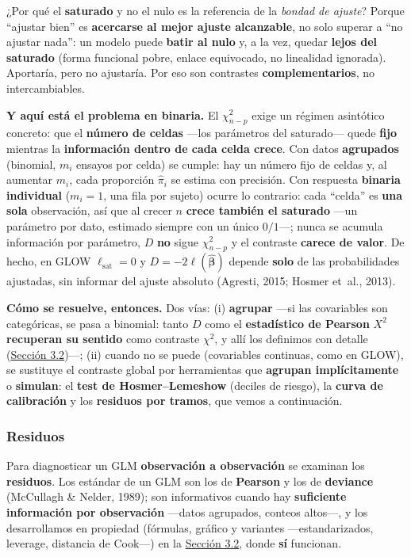 \documentclass[
  letterpaper,
  DIV=11,
  numbers=noendperiod]{scrartcl}
\begin{document}
¿Por qué el \textbf{saturado} y no el nulo es la referencia de la
\emph{bondad de ajuste}? Porque ``ajustar bien'' es \textbf{acercarse al
mejor ajuste alcanzable}, no solo superar a ``no ajustar nada'': un
modelo puede \textbf{batir al nulo} y, a la vez, quedar \textbf{lejos
del saturado} (forma funcional pobre, enlace equivocado, no linealidad
ignorada). Aportaría, pero no ajustaría. Por eso son contrastes
\textbf{complementarios}, no intercambiables.

\textbf{Y aquí está el problema en binaria.} El \(\chi^2_{n-p}\) exige
un régimen asintótico concreto: que el \textbf{número de celdas} ---los
parámetros del saturado--- quede \textbf{fijo} mientras la
\textbf{información dentro de cada celda crece}. Con datos
\textbf{agrupados} (binomial, \(m_i\) ensayos por celda) se cumple: hay
un número fijo de celdas y, al aumentar \(m_i\), cada proporción
\(\hat\pi_i\) se estima con precisión. Con respuesta \textbf{binaria
individual} (\(m_i=1\), una fila por sujeto) ocurre lo contrario: cada
``celda'' es \textbf{una sola} observación, así que al crecer \(n\)
\textbf{crece también el saturado} ---un parámetro por dato, estimado
siempre con un único \(0/1\)---; nunca se acumula información por
parámetro, \(D\) \textbf{no} sigue \(\chi^2_{n-p}\) y el contraste
\textbf{carece de valor}. De hecho, en GLOW \(\ell_{\text{sat}}=0\) y
\(D=-2\ell(\hat{\boldsymbol\beta})\) depende \textbf{solo} de las
probabilidades ajustadas, sin informar del ajuste absoluto (Agresti,
2015; Hosmer et~al., 2013).

\textbf{Cómo se resuelve, entonces.} Dos vías: (i) \textbf{agrupar}
---si las covariables son categóricas, se pasa a binomial: tanto \(D\)
como el \textbf{estadístico de Pearson} \(X^2\) \textbf{recuperan su
sentido} como contraste \(\chi^2\), y allí los definimos con detalle
(\protect\hyperlink{sec-u13-gof-binomial}{Sección 3.2})---; (ii) cuando
no se puede (covariables continuas, como en GLOW), se sustituye el
contraste global por herramientas que \textbf{agrupan implícitamente} o
\textbf{simulan}: el \textbf{test de Hosmer--Lemeshow} (deciles de
riesgo), la \textbf{curva de calibración} y los \textbf{residuos por
tramos}, que vemos a continuación.

\hypertarget{residuos}{%
\subsubsection{Residuos}\label{residuos}}

Para diagnosticar un GLM \textbf{observación a observación} se examinan
los \textbf{residuos}. Los estándar de un GLM son los de
\textbf{Pearson} y los de \textbf{deviance} (McCullagh \& Nelder, 1989);
son informativos cuando hay \textbf{suficiente información por
observación} ---datos agrupados, conteos altos---, y los desarrollamos
en propiedad (fórmulas, gráfico y variantes ---estandarizados, leverage,
distancia de Cook---) en la
\protect\hyperlink{sec-u13-gof-binomial}{Sección 3.2}, donde \textbf{sí}
funcionan.
\end{document}

